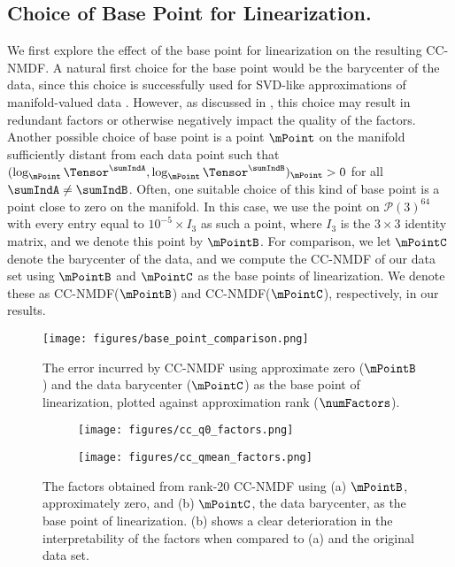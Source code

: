 \subsection{Choice of Base Point for Linearization.}
\label{sec:numerics base point}
We first explore the effect of the base point for linearization on the resulting CC-NMDF. A natural first choice for the base point would be the barycenter of the data, since this choice is successfully used for SVD-like approximations of manifold-valued data \citep{diepeveen2023curvature}. However, as discussed in , this choice may result in redundant factors or otherwise negatively impact the quality of the factors. Another possible choice of base point is a point $\mPoint$ on the manifold sufficiently distant from each data point such that $(\log_{\mPoint} \Tensor^\sumIndA, \log_{\mPoint} \Tensor^\sumIndB)_{\mPoint} > 0$ for all $\sumIndA \neq \sumIndB$. Often, one suitable choice of this kind of base point is a point close to zero on the manifold. In this case, we use the point on $\mathcal{P}(3)^{64}$ with every entry equal to $10^{-5} \times I_3$ as such a point, where $I_3$ is the $3 \times 3$ identity matrix, and we denote this point by $\mPointB$. For comparison, we let $\mPointC$ denote the barycenter of the data, and we compute the CC-NMDF of our data set using $\mPointB$ and $\mPointC$ as the base points of linearization. We denote these as CC-NMDF($\mPointB$) and CC-NMDF($\mPointC$), respectively, in our results. 

\begin{figure}[t!]
    \centering
    \texttt{[image: figures/base\_point\_comparison.png]}
    \caption{The error incurred by CC-NMDF using approximate zero ($\mPointB$) and the data barycenter ($\mPointC$) as the base point of linearization, plotted against approximation rank ($\numFactors$).}
    \label{fig:cc_q0_qmean_loss}
\end{figure}
\begin{figure}[t!]
    \centering
    \begin{subfigure}{0.48\linewidth}
        \texttt{[image: figures/cc\_q0\_factors.png]}
        \caption{}
    \end{subfigure}
    \hfill
    \begin{subfigure}{0.48\linewidth}
        \texttt{[image: figures/cc\_qmean\_factors.png]}
        \caption{}
        \label{fig:cc_qmean_factors}
    \end{subfigure}
    \caption{The factors obtained from rank-20 CC-NMDF using (a) $\mPointB$, approximately zero, and (b) $\mPointC$, the data barycenter, as the base point of linearization. (b) shows a clear deterioration in the interpretability of the factors when compared to (a) and the original data set.}
    \label{fig:cc_q0_qmean_factors}
\end{figure}

